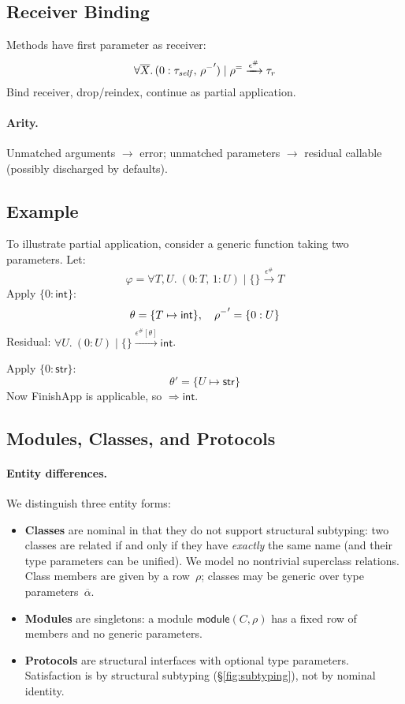 \subsection{Receiver Binding}
\label{sec:receiver-binding}
Methods have first parameter as receiver:
\[
\forall \overline{X}.\,(0:\tau_{\mathit{self}},\,\mathord{\rho^{-}}') \mid \mathord{\rho^{=}} \xrightarrow{\epsilon^\#} \tau_r
\]
Bind receiver, drop/reindex, continue as partial application.

\paragraph{Arity.}
Unmatched arguments $\to$ error; unmatched parameters $\to$ residual callable (possibly discharged by defaults).

\subsection{Example}
To illustrate partial application, consider a generic function taking two parameters. Let:
\[
\varphi = \forall T,U.~(0:T,\,1:U) \mid \{\} \xrightarrow{\epsilon^\#} T
\]
Apply $\{0:\mathsf{int}\}$:
\[
\theta=\{T\mapsto \mathsf{int}\},\quad \mathord{\rho^{-}}'=\{0:U\}
\]
Residual: $\forall U.~(0:U) \mid \{\} \xrightarrow{\epsilon^\#[\theta]} \mathsf{int}$.

Apply $\{0:\mathsf{str}\}$:
\[
\theta'=\{U\mapsto \mathsf{str}\}
\]
Now \textsf{FinishApp} is applicable, so $\Rightarrow \mathsf{int}$.

\subsection{Modules, Classes, and Protocols}
\label{sec:modules-classes-protocols}

\paragraph{Entity differences.}
We distinguish three entity forms:
\begin{itemize}
    \item \textbf{Classes} are nominal in that they do not support structural subtyping: two classes are related if and only if they have \emph{exactly} the same name (and their type parameters can be unified). We model no nontrivial superclass relations. Class members are given by a row~$\rho$; classes may be generic over type parameters~$\overline{\alpha}$.
    \item \textbf{Modules} are singletons: a module $\mathsf{module}(C, \rho)$ has a fixed row of members and no generic parameters.
    \item \textbf{Protocols} are structural interfaces with optional type parameters. Satisfaction is by structural subtyping (\S\ref{fig:subtyping}), not by nominal identity.
\end{itemize}

